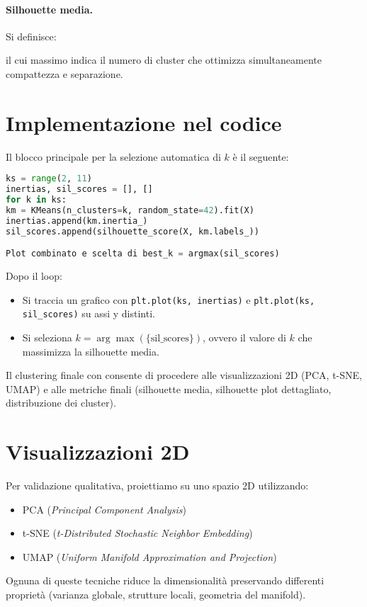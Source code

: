 \documentclass[a4paper,12pt]{article}
\begin{document}
\paragraph{Silhouette media.} Si definisce:



il cui massimo indica il numero di cluster che ottimizza simultaneamente compattezza e separazione.

\section{Implementazione nel codice}
Il blocco principale per la selezione automatica di $k$ è il seguente:
\begin{lstlisting}[language=Python,caption={Elbow \& Silhouette loop}]
ks = range(2, 11)
inertias, sil_scores = [], []
for k in ks:
km = KMeans(n_clusters=k, random_state=42).fit(X)
inertias.append(km.inertia_)
sil_scores.append(silhouette_score(X, km.labels_))

Plot combinato e scelta di best_k = argmax(sil_scores)

\end{lstlisting}

Dopo il loop:
\begin{itemize}
\item Si traccia un grafico con \texttt{plt.plot(ks, inertias)} e \texttt{plt.plot(ks, sil\_scores)} su assi y distinti.
\item Si seleziona \(k = \arg\max(\{\mathrm{sil\_scores}\})\), ovvero il valore di \(k\) che massimizza la silhouette media.
\end{itemize}

Il clustering finale con  consente di procedere alle visualizzazioni 2D (PCA, t-SNE, UMAP) e alle metriche finali (silhouette media, silhouette plot dettagliato, distribuzione dei cluster).

\section{Visualizzazioni 2D}
Per validazione qualitativa, proiettiamo  su uno spazio 2D utilizzando:
\begin{itemize}
\item PCA (\emph{Principal Component Analysis})
\item t-SNE (\emph{t-Distributed Stochastic Neighbor Embedding})
\item UMAP (\emph{Uniform Manifold Approximation and Projection})
\end{itemize}
Ognuna di queste tecniche riduce la dimensionalità preservando differenti proprietà (varianza globale, strutture locali, geometria del manifold).
\end{document}
